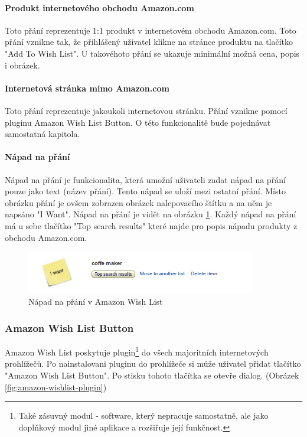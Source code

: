 \paragraph{Produkt internetového obchodu Amazon.com}
Toto přání reprezentuje 1:1 produkt v internetovém obchodu Amazon.com. Toto přání vznikne tak, že přihlášený uživatel klikne na stránce produktu na tlačítko "Add To Wish List". U takovéhoto přání se ukazuje minimální možná cena, popis i obrázek.

\paragraph{Internetová stránka mimo Amazon.com}
Toto přání reprezentuje jakoukoli internetovou stránku. Přání vznikne pomocí pluginu Amazon Wish List Button. O této funkcionalitě bude pojednávat samostatná kapitola.

\paragraph{Nápad na přání}
Nápad na přání je funkcionalita, která umožní uživateli zadat nápad na přání pouze jako text (název přání). Tento nápad se uloží mezi ostatní přání. Místo obrázku přání je ovšem zobrazen obrázek nalepovacího štítku a na něm je napsáno "I Want". Nápad na přání je vidět na obrázku \ref{fig:amazon-wishlist-idea}. Každý nápad na přání má u sebe tlačítko "Top search results" které najde pro popis nápadu produkty z obchodu Amazon.com.

\begin{figure}[htb]
\begin{center}
\includegraphics[width=100mm]{./pictures/amazon-wishlist-idea.png}
\caption{Nápad na přání v Amazon Wish List}
\label{fig:amazon-wishlist-idea}
\end{center}
\end{figure}

\subsubsection{Amazon Wish List Button}
Amazon Wish List poskytuje plugin\footnote{Také zásuvný modul - software, který nepracuje samostatně, ale jako doplňkový modul jiné aplikace a rozšiřuje její funkčnost.} do všech majoritních internetových prohlížečů\cite{website:amazon:plugin}. Po nainstalovani pluginu do prohlížeče si může uživatel přidat tlačítko "Amazon Wish List Button". Po stisku tohoto tlačítka se otevře dialog. (Obrázek \ref{fig:amazon-wishlist-plugin})


